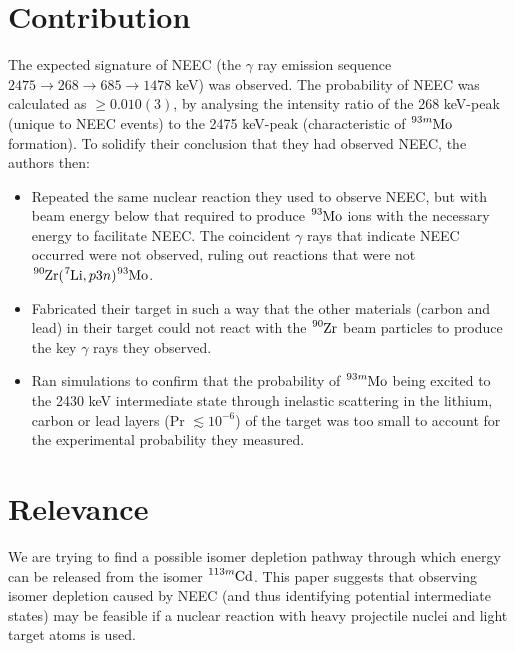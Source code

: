 \documentclass[12pt,a4paper]{article}
\begin{document}
\section*{Contribution}
The expected signature of NEEC (the $\gamma$ ray emission sequence $2475\rightarrow 268\rightarrow 685\rightarrow 1478$ keV) was observed. The probability of NEEC was calculated as $\geq 0.010(3)$, by analysing the intensity ratio of the 268 keV-peak (unique to NEEC events) to the 2475 keV-peak (characteristic of $\ce{^{93m}Mo}$ formation). To solidify their conclusion that they had observed NEEC, the authors then:
\begin{itemize}
\item Repeated the same nuclear reaction they used to observe NEEC, but with beam energy below that required to produce $\ce{^{93}Mo}$ ions with the necessary energy to facilitate NEEC. The coincident $\gamma$ rays that indicate NEEC occurred were not observed, ruling out reactions that were not $\ce{^{90}Zr}(\ce{^{7}Li},p3n)\ce{^{93}Mo}$.
\item Fabricated their target in such a way that the other materials (carbon and lead) in their target could not react with the $\ce{^{90}Zr}$ beam particles to produce the key $\gamma$ rays they observed.
\item Ran simulations to confirm that the probability of $\ce{^{93m}Mo}$ being excited to the 2430 keV intermediate state through inelastic scattering in the lithium, carbon or lead layers (Pr $\lesssim 10^{-6}$) of the target was too small to account for the experimental probability they measured.
\end{itemize}

\section*{Relevance}
We are trying to find a possible isomer depletion pathway through which energy can be released from the isomer $\ce{^{113m}Cd}$. This paper suggests that observing isomer depletion caused by NEEC (and thus identifying potential intermediate states) may be feasible if a nuclear reaction with heavy projectile nuclei and light target atoms is used.
\end{document}
